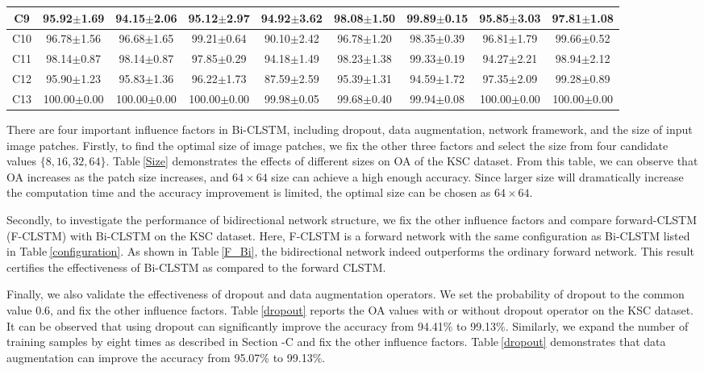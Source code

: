 \documentclass[12pt,onecolumn]{IEEEtran}
\begin{document}
\begin{spacing}{2}
\begin{table}
\begin{tabular}{|c|c|c|c|c|c|c|c|c|}
C9    & 95.92$\pm$1.69  & 94.15$\pm$2.06 & 95.12$\pm$2.97  & 94.92$\pm$3.62  & 98.08$\pm$1.50  & 99.89$\pm$0.15  & 95.85$\pm$3.03  & 97.81$\pm$1.08 \\ \hline
C10    & 96.78$\pm$1.56 & 96.68$\pm$1.65 & 99.21$\pm$0.64 & 90.10$\pm$2.42   & 96.78$\pm$1.20  & 98.35$\pm$0.39  & 96.81$\pm$1.79  & 99.66$\pm$0.52 \\ \hline
C11    & 98.14$\pm$0.87  & 98.14$\pm$0.87 & 97.85$\pm$0.29 & 94.18$\pm$1.49  & 98.23$\pm$1.38  & 99.33$\pm$0.19  & 94.27$\pm$2.21 & 98.94$\pm$2.12 \\ \hline
C12    & 95.90$\pm$1.23 & 95.83$\pm$1.36 & 96.22$\pm$1.73  & 87.59$\pm$2.59  & 95.39$\pm$1.31  & 94.59$\pm$1.72  & 97.35$\pm$2.09 & 99.28$\pm$0.89\\ \hline
C13    & 100.00$\pm$0.00&100.00$\pm$0.00 &100.00$\pm$0.00  & 99.98$\pm$0.05  & 99.68$\pm$0.40  & 99.94$\pm$0.08  & 100.00$\pm$0.00 & 100.00$\pm$0.00 \\ \hline
\end{tabular}
\end{table}

There are four important influence factors in Bi-CLSTM, including dropout, data augmentation, network framework, and the size of input image patches. Firstly, to find the optimal size of image patches, we
fix the other three factors and select the size from four candidate values $\{8,16,32,64\}$. Table$~$\ref{Size} demonstrates the effects of different sizes on OA of the KSC dataset. From this table, we can observe that OA increases as the patch size increases, and $64\times64$ size can achieve a high enough accuracy. Since larger size will dramatically increase the computation time and the accuracy improvement is limited, the optimal size can be chosen as $64\times64$.

Secondly, to investigate the performance of bidirectional network structure, we fix the other influence factors and compare forward-CLSTM (F-CLSTM) with Bi-CLSTM on the KSC dataset. Here, F-CLSTM is a forward network with the same configuration as Bi-CLSTM listed in Table$~$\ref{configuration}. As shown in Table$~$\ref{F_Bi}, the bidirectional network indeed outperforms the ordinary forward network. This result certifies the effectiveness of Bi-CLSTM as compared to the forward CLSTM.

Finally, we also validate the effectiveness of dropout and data augmentation operators. We set the probability of dropout to the common value 0.6, and fix the other influence factors. Table$~$\ref{dropout} reports the OA values with or without dropout operator on the KSC dataset. It can be observed that using dropout can significantly improve the accuracy from 94.41\% to 99.13\%. Similarly, we expand the number of training samples by eight times as described in Section \uppercase\expandafter{}-C and fix the other influence factors. Table$~$\ref{dropout} demonstrates that data augmentation can improve the accuracy from 95.07\% to 99.13\%.



\end{spacing}
\end{document}
